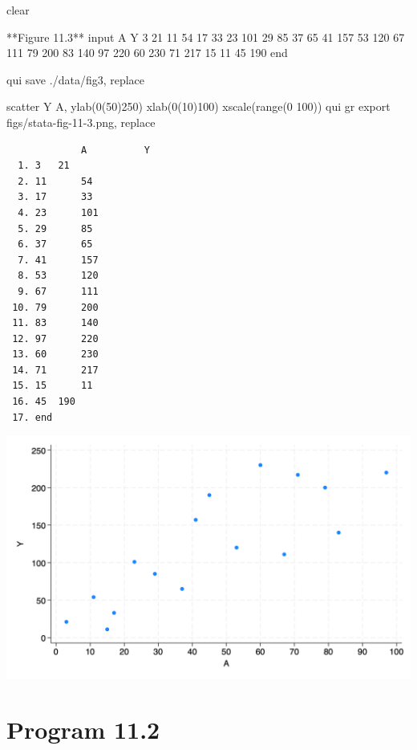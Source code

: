 \documentclass[
  10pt,
  a4paper,
]{book}
\newenvironment{Shaded}{\begin{snugshade}}{\end{snugshade}}
\newcommand{\BaseNTok}[1]{\textcolor[rgb]{0.68,0.00,0.00}{#1}}
\newcommand{\KeywordTok}[1]{\textcolor[rgb]{0.00,0.46,0.62}{#1}}
\newcommand{\NormalTok}[1]{\textcolor[rgb]{0.00,0.46,0.62}{#1}}
\begin{document}
\begin{Shaded}
\begin{Highlighting}[]
\KeywordTok{clear}

\NormalTok{**Figure 11.3**}
\NormalTok{input A Y}
\NormalTok{3   21  }
\NormalTok{11  54}
\NormalTok{17  33}
\NormalTok{23  101}
\NormalTok{29  85}
\NormalTok{37  65}
\NormalTok{41  157}
\NormalTok{53  120}
\NormalTok{67  111}
\NormalTok{79  200}
\NormalTok{83  140}
\NormalTok{97  220}
\NormalTok{60  230}
\NormalTok{71  217}
\NormalTok{15  11}
\NormalTok{45  190}
\KeywordTok{end}

\KeywordTok{qui} \KeywordTok{save}\NormalTok{ ./}\KeywordTok{data}\NormalTok{/fig3, }\KeywordTok{replace}

\KeywordTok{scatter}\NormalTok{ Y A, ylab(0(50)250) xlab(0(10)100) }\BaseNTok{xscale}\NormalTok{(}\KeywordTok{range}\NormalTok{(0 100))}
\KeywordTok{qui} \KeywordTok{gr} \KeywordTok{export}\NormalTok{ figs/stata{-}fig{-}11{-}3.png, }\KeywordTok{replace}
\end{Highlighting}
\end{Shaded}

\begin{verbatim}
             A          Y
  1. 3   21  
  2. 11      54
  3. 17      33
  4. 23      101
  5. 29      85
  6. 37      65
  7. 41      157
  8. 53      120
  9. 67      111
 10. 79      200
 11. 83      140
 12. 97      220
 13. 60      230
 14. 71      217
 15. 15      11
 16. 45  190
 17. end
\end{verbatim}

\begin{center}\includegraphics[width=0.85\linewidth]{figs/stata-fig-11-3} \end{center}

\section{Program 11.2}\label{program-11.2-1}
\end{document}
